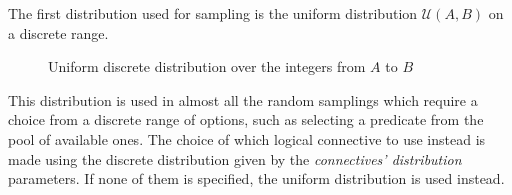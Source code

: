 The first distribution used for sampling is the uniform distribution \(\mathcal{U}(A,B)\) on a discrete range.
\begin{figure}[H]
  \centering
  \caption{Uniform discrete distribution over the integers from \(A\) to \(B\)}\label{fig:uniform-discrete-distribution-interval}
\end{figure}

This distribution is used in almost all the random samplings which require a choice from a discrete range of options, such as selecting a predicate from the pool of available ones.
The choice of which logical connective to use instead is made using the discrete distribution given by the \emph{connectives' distribution} parameters. If none of them is specified, the uniform distribution is used instead.

